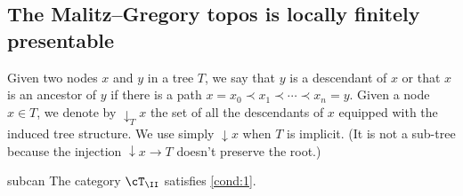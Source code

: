 \documentclass[numberwithin=section]{papier}
\begin{document}
\subsection{The Malitz--Gregory topos is locally finitely presentable}
\label{subsec:MGwellfounded}

Given two nodes $x$ and $y$ in a tree $T$, we say that $y$ is a descendant of $x$ or that $x$ is an ancestor of $y$ if there is a path $x = x_0 \prec x_1 \prec ⋯ \prec x_n = y$. Given a node $x ∈ T$, we denote by ${↓_T}x$ the set of all the descendants of $x$ equipped with the induced tree structure. We use simply ${↓}x$ when $T$ is implicit. (It is not a sub-tree because the injection ${↓}x→T$ doesn't preserve the root.)

\begin{lem}{}{subcan}
	The category $\cT_\II$ satisfies \ref{cond:1}.
\end{lem}
\end{document}
